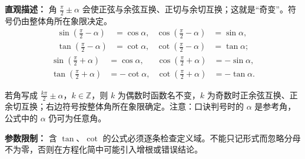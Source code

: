 \begin{statementbox}
\begin{description}[style=nextline, leftmargin=2.8em, labelsep=0.5em, itemsep=0.45em]
\item[\textbf{\textcolor{CStatement}{结论二（变名公式）：}}]
\textbf{\textcolor{CStatement}{直观描述：}} 角 $\frac{\pi}{2}\pm\alpha$ 会使正弦与余弦互换、正切与余切互换；这就是“奇变”。符号仍由整体角所在象限决定。
\[
\begin{aligned}
\sin\left(\frac{\pi}{2}-\alpha\right)&=\cos\alpha, &
\cos\left(\frac{\pi}{2}-\alpha\right)&=\sin\alpha,\\
\tan\left(\frac{\pi}{2}-\alpha\right)&=\cot\alpha, &
\cot\left(\frac{\pi}{2}-\alpha\right)&=\tan\alpha;
\end{aligned}
\]
\[
\begin{aligned}
\sin\left(\frac{\pi}{2}+\alpha\right)&=\cos\alpha, &
\cos\left(\frac{\pi}{2}+\alpha\right)&=-\sin\alpha,\\
\tan\left(\frac{\pi}{2}+\alpha\right)&=-\cot\alpha, &
\cot\left(\frac{\pi}{2}+\alpha\right)&=-\tan\alpha.
\end{aligned}
\]

\item[\textbf{\textcolor{CStatement}{口诀版（统一记法）：}}]
若角写成 $\frac{k\pi}{2}\pm\alpha$，$k\in\mathbb{Z}$，则 $k$ 为偶数时函数名不变，$k$ 为奇数时正余弦互换、正余切互换；右边符号按整体角所在象限确定。注意：口诀判号时的 $\alpha$ 是参考角，公式中的 $\alpha$ 仍可为任意角。
\end{description}

\medskip
\textbf{\textcolor{CStatement}{参数限制：}} 含 $\tan$、$\cot$ 的公式必须逐条检查定义域。不能只记形式而忽略分母不为零，否则在方程化简中可能引入增根或错误结论。
\end{statementbox}
